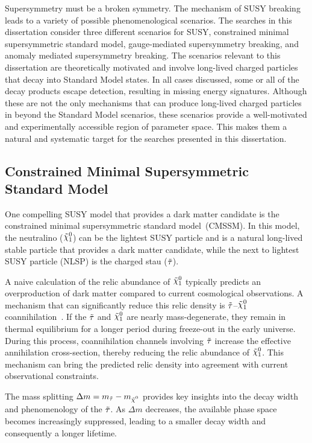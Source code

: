 Supersymmetry must be a broken symmetry. The mechanism of SUSY breaking leads to a variety of possible phenomenological scenarios.
The searches in this dissertation consider three different scenarios for SUSY, constrained minimal supersymmetric standard model, gauge-mediated supersymmetry breaking, and anomaly mediated supersymmetry breaking.
The scenarios relevant to this dissertation are theoretically motivated and involve long-lived charged particles that decay into Standard Model states. In all cases discussed, some or all of the decay products escape detection, resulting in missing energy signatures. Although these are not the only mechanisms that can produce long-lived charged particles in beyond the Standard Model scenarios, these scenarios provide a well-motivated and experimentally accessible region of parameter space. This makes them a natural and systematic target for the searches presented in this dissertation.

\subsection{Constrained Minimal Supersymmetric Standard Model}
\label{sec:CMSSM_stau}
One compelling SUSY model that provides a dark matter candidate is the constrained minimal supersymmetric standard model~(CMSSM).
In this model, the neutralino ($\ninoone$) can be the lightest SUSY particle and is a natural long-lived stable particle that provides a dark matter candidate, while the next to lightest SUSY particle (NLSP) is the charged stau ($\tilde{\tau}$).



A naive calculation of the relic abundance of $\ninoone$ typically predicts an overproduction of dark matter compared to current cosmological observations. A mechanism that can significantly reduce this relic density is $\tilde{\tau}$–$\ninoone$ coannihilation~\cite{GriestKim1991Teit}. If the $\tilde{\tau}$ and $\ninoone$ are nearly mass-degenerate, they remain in thermal equilibrium for a longer period during freeze-out in the early universe. During this process, coannihilation channels involving $\tilde{\tau}$ increase the effective annihilation cross-section, thereby reducing the relic abundance of $\ninoone$. This mechanism can bring the predicted relic density into agreement with current observational constraints.

The mass splitting $\Delta m = m_{\stau} - m_{\nino}$ provides key insights into the decay width and phenomenology of the $\tilde{\tau}$. As $\Delta m$ decreases, the available phase space becomes increasingly suppressed, leading to a smaller decay width and consequently a longer lifetime.

